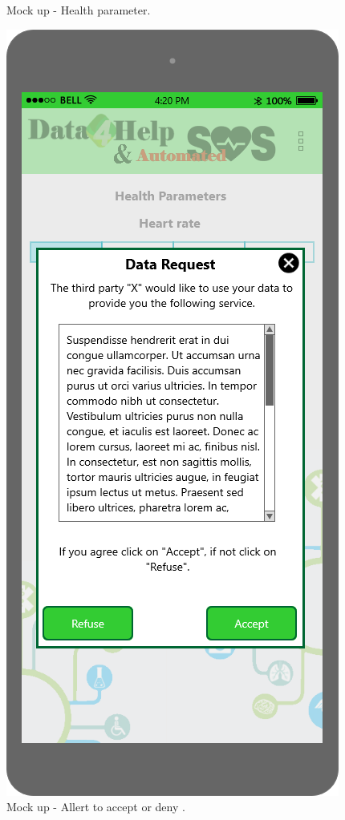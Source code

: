 \begin{figure}[h!]
\begin{minipage}[b]{0.25\textwidth}
    		\caption{Mock up - Health parameter.}
	\end{minipage}
	\hfill
	\begin{minipage}[b]{0.25\textwidth}
    		\includegraphics[width=\textwidth]{./pictures/notification.png}
    		\caption{Mock up - Allert to accept or deny .}
	\end{minipage}
\end{figure}

